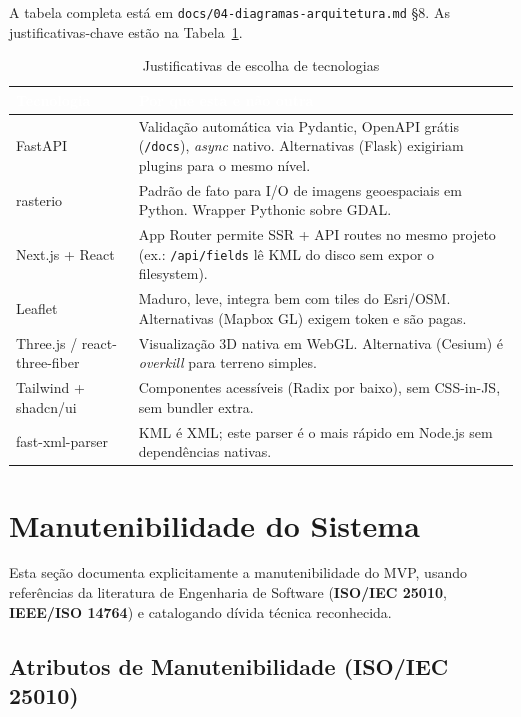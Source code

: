 \documentclass[11pt, a4paper]{article}
\begin{document}
A tabela completa está em \texttt{docs/04-diagramas-arquitetura.md} \S 8. As justificativas-chave estão na Tabela~\ref{tab:tech}.

\begin{table}[H]
\centering
\small
{}
\begin{tabularx}{\textwidth}{@{}lX@{}}
\toprule
\rowcolor{tabheader}\textcolor{white}{\textbf{Tecnologia}} & \textcolor{white}{\textbf{Por que esta e não outra}}\\
\midrule
FastAPI & Validação automática via Pydantic, OpenAPI grátis (\texttt{/docs}), \textit{async} nativo. Alternativas (Flask) exigiriam plugins para o mesmo nível.\\
rasterio & Padrão de fato para I/O de imagens geoespaciais em Python. Wrapper Pythonic sobre GDAL.\\
Next.js + React & App Router permite SSR + API routes no mesmo projeto (ex.: \texttt{/api/fields} lê KML do disco sem expor o filesystem).\\
Leaflet & Maduro, leve, integra bem com tiles do Esri/OSM. Alternativas (Mapbox GL) exigem token e são pagas.\\
Three.js / react-three-fiber & Visualização 3D nativa em WebGL. Alternativa (Cesium) é \textit{overkill} para terreno simples.\\
Tailwind + shadcn/ui & Componentes acessíveis (Radix por baixo), sem CSS-in-JS, sem bundler extra.\\
fast-xml-parser & KML é XML; este parser é o mais rápido em Node.js sem dependências nativas.\\
\bottomrule
\end{tabularx}
\caption{Justificativas de escolha de tecnologias}
\label{tab:tech}
\end{table}

\section{Manutenibilidade do Sistema}
\label{sec:manutenibilidade}

Esta seção documenta explicitamente a manutenibilidade do MVP, usando referências da literatura de Engenharia de Software (\textbf{ISO/IEC 25010}, \textbf{IEEE/ISO 14764}) e catalogando dívida técnica reconhecida.

\subsection{Atributos de Manutenibilidade (ISO/IEC 25010)}
\end{document}
